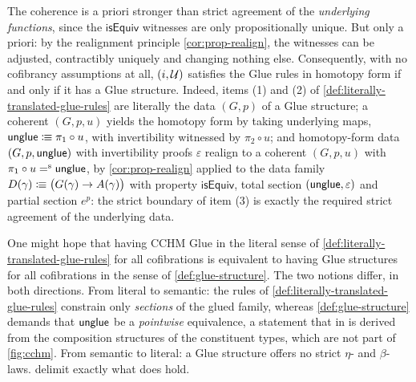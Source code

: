 \begin{remark}[\flink{Remark-4-4} Homotopy form $=$ Glue structure]\label{lem:homotopy-vs-semantic}\label{def:homotopy-glue-rules}
	The coherence is a priori stronger than strict agreement of the
	\emph{underlying functions}, since the $\mathsf{isEquiv}$ witnesses are
	only propositionally unique. But only a priori: by the realignment
	principle \cref{cor:prop-realign}, the witnesses can be adjusted,
	contractibly uniquely and changing nothing else. Consequently, with no
	cofibrancy assumptions at all, $(i,\mathcal{U})$ satisfies the Glue rules in
	homotopy form if and only if it has a Glue structure.
	Indeed, items (1) and (2) of \cref{def:literally-translated-glue-rules}
	are literally the data $(G,p)$ of a Glue structure; a coherent
	$(G,p,u)$ yields the homotopy form by taking underlying maps,
	$\mathsf{unglue}\mathrel{\vcentcolon\mspace{-1mu}\equiv}\pi_1\circ u$, with invertibility witnessed by
	$\pi_2\circ u$; and homotopy-form data $(G,p,\mathsf{unglue})$ with
	invertibility proofs $\varepsilon$ realign to a coherent
	$(G,p,u)$ with $\pi_1\circ u\mathrel{=^\textup{s}}\mathsf{unglue}$, by \cref{cor:prop-realign}
	applied to the data family
	$D(\gamma)\mathrel{\vcentcolon\mspace{-1mu}\equiv}\bigl(G(\gamma)\to A(\gamma)\bigr)$ with property
	$\mathsf{isEquiv}$, total section $(\mathsf{unglue},\varepsilon)$ and partial
	section $e^{p}$: the strict boundary of item (3) is exactly the
	required strict agreement of the underlying data.
\end{remark}





One might hope that having CCHM Glue in the literal sense of
\cref{def:literally-translated-glue-rules} for all cofibrations is
equivalent to having Glue structures for all cofibrations in the sense of
\cref{def:glue-structure}. The two notions differ, in both directions. From
literal to semantic: the rules of \cref{def:literally-translated-glue-rules}
constrain only \emph{sections} of the glued family, whereas
\cref{def:glue-structure} demands that $\mathsf{unglue}$ be a \emph{pointwise}
equivalence, a statement that in \citet[\S7.2]{CCHM2018} is derived from the
composition structures of the constituent types, which are not part of \cref{fig:cchm}. From
semantic to literal: a Glue structure offers no strict $\eta$- and
$\beta$-laws. 
delimit exactly what does hold.

